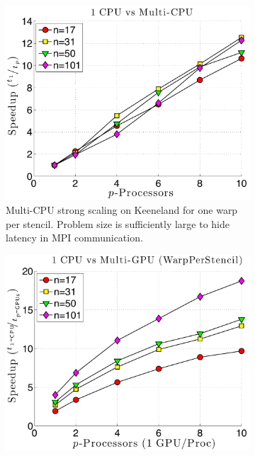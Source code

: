 \begin{figure}
\centering
\begin{subfigure}[t]{0.425\textwidth}
\centering
\includegraphics[width=1.0\textwidth]{../figures/keeneland_results/alltoallv/speedup_1CPU_vs_NCPU.pdf}
\caption{Multi-CPU strong scaling on Keeneland for one warp per stencil. Problem size is sufficiently large to hide latency in MPI communication.}
\label{fig:alltoall_multicpu_scaling}
\end{subfigure} 
\begin{subfigure}[t]{0.425\textwidth}
\centering
\includegraphics[width=1.0\textwidth]{../figures/keeneland_results/alltoallv/speedup_1CPU_vs_NGPU_WarpPerStencil.pdf}

\end{subfigure}
\end{figure}
